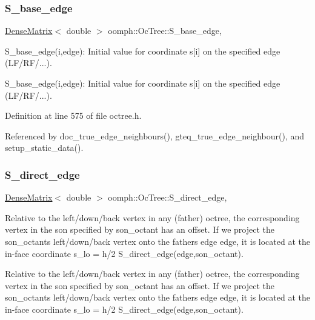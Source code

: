 \subsubsection{\texorpdfstring{S\+\_\+base\+\_\+edge}{S\_base\_edge}}
{\footnotesize\ttfamily \hyperlink{classoomph_1_1DenseMatrix}{Dense\+Matrix}$<$ double $>$ oomph\+::\+Oc\+Tree\+::\+S\+\_\+base\+\_\+edge\hspace{0.3cm}{\ttfamily [static]}, {\ttfamily [private]}}



S\+\_\+base\+\_\+edge(i,edge)\+: Initial value for coordinate s\mbox{[}i\mbox{]} on the specified edge (L\+F/\+R\+F/...). 

S\+\_\+base\+\_\+edge(i,edge)\+: Initial value for coordinate s\mbox{[}i\mbox{]} on the specified edge (L\+F/\+R\+F/...). 

Definition at line 575 of file octree.\+h.



Referenced by doc\+\_\+true\+\_\+edge\+\_\+neighbours(), gteq\+\_\+true\+\_\+edge\+\_\+neighbour(), and setup\+\_\+static\+\_\+data().

\mbox{\label{classoomph_1_1OcTree_abf12711759332ae1d0b55da939b62aa0}} 
\subsubsection{\texorpdfstring{S\+\_\+direct\+\_\+edge}{S\_direct\_edge}}
{\footnotesize\ttfamily \hyperlink{classoomph_1_1DenseMatrix}{Dense\+Matrix}$<$ double $>$ oomph\+::\+Oc\+Tree\+::\+S\+\_\+direct\+\_\+edge\hspace{0.3cm}{\ttfamily [static]}, {\ttfamily [private]}}



Relative to the left/down/back vertex in any (father) octree, the corresponding vertex in the son specified by {\ttfamily son\+\_\+octant} has an offset. If we project the son\+\_\+octant\textquotesingle{}s left/down/back vertex onto the father\textquotesingle{}s edge {\ttfamily edge}, it is located at the in-\/face coordinate {\ttfamily s\+\_\+lo} = h/2 {\ttfamily S\+\_\+direct\+\_\+edge(edge,son\+\_\+octant)}. 

Relative to the left/down/back vertex in any (father) octree, the corresponding vertex in the son specified by {\ttfamily son\+\_\+octant} has an offset. If we project the son\+\_\+octant\textquotesingle{}s left/down/back vertex onto the father\textquotesingle{}s edge {\ttfamily edge}, it is located at the in-\/face coordinate {\ttfamily s\+\_\+lo} = h/2 {\ttfamily S\+\_\+direct\+\_\+edge(edge,son\+\_\+octant)}. 

